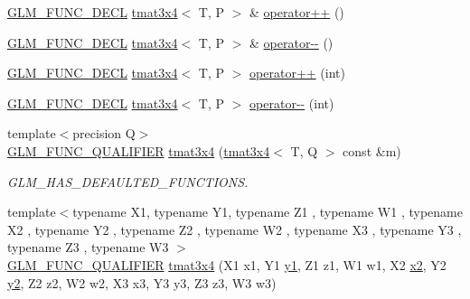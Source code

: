 \begin{DoxyCompactItemize}
\item 
\mbox{\hyperlink{setup_8hpp_ab2d052de21a70539923e9bcbf6e83a51}{G\+L\+M\+\_\+\+F\+U\+N\+C\+\_\+\+D\+E\+CL}} \mbox{\hyperlink{structglm_1_1tmat3x4}{tmat3x4}}$<$ T, P $>$ \& \mbox{\hyperlink{structglm_1_1tmat3x4_ac24005ff599f4b6d3110d252c6b173ea}{operator++}} ()
\item 
\mbox{\hyperlink{setup_8hpp_ab2d052de21a70539923e9bcbf6e83a51}{G\+L\+M\+\_\+\+F\+U\+N\+C\+\_\+\+D\+E\+CL}} \mbox{\hyperlink{structglm_1_1tmat3x4}{tmat3x4}}$<$ T, P $>$ \& \mbox{\hyperlink{structglm_1_1tmat3x4_a5198a23b569931c189191afb025d46e2}{operator-\/-\/}} ()
\item 
\mbox{\hyperlink{setup_8hpp_ab2d052de21a70539923e9bcbf6e83a51}{G\+L\+M\+\_\+\+F\+U\+N\+C\+\_\+\+D\+E\+CL}} \mbox{\hyperlink{structglm_1_1tmat3x4}{tmat3x4}}$<$ T, P $>$ \mbox{\hyperlink{structglm_1_1tmat3x4_a6c7a0194f873068b10b4e1404cba0a89}{operator++}} (int)
\item 
\mbox{\hyperlink{setup_8hpp_ab2d052de21a70539923e9bcbf6e83a51}{G\+L\+M\+\_\+\+F\+U\+N\+C\+\_\+\+D\+E\+CL}} \mbox{\hyperlink{structglm_1_1tmat3x4}{tmat3x4}}$<$ T, P $>$ \mbox{\hyperlink{structglm_1_1tmat3x4_a21eeeba593a5e46ece34f418f43f7a3b}{operator-\/-\/}} (int)
\item 
{\footnotesize template$<$precision Q$>$ }\\\mbox{\hyperlink{setup_8hpp_a33fdea6f91c5f834105f7415e2a64407}{G\+L\+M\+\_\+\+F\+U\+N\+C\+\_\+\+Q\+U\+A\+L\+I\+F\+I\+ER}} \mbox{\hyperlink{structglm_1_1tmat3x4_a2f48d00df66c48b9d37f53aed6bcdec7}{tmat3x4}} (\mbox{\hyperlink{structglm_1_1tmat3x4}{tmat3x4}}$<$ T, Q $>$ const \&m)
\begin{DoxyCompactList}\small\item\em G\+L\+M\+\_\+\+H\+A\+S\+\_\+\+D\+E\+F\+A\+U\+L\+T\+E\+D\+\_\+\+F\+U\+N\+C\+T\+I\+O\+NS. \end{DoxyCompactList}\item 
{\footnotesize template$<$typename X1, typename Y1, typename Z1 , typename W1 , typename X2 , typename Y2 , typename Z2 , typename W2 , typename X3 , typename Y3 , typename Z3 , typename W3 $>$ }\\\mbox{\hyperlink{setup_8hpp_a33fdea6f91c5f834105f7415e2a64407}{G\+L\+M\+\_\+\+F\+U\+N\+C\+\_\+\+Q\+U\+A\+L\+I\+F\+I\+ER}} \mbox{\hyperlink{structglm_1_1tmat3x4_a98439a8c3c24d4185e3e96148d8fbee2}{tmat3x4}} (X1 x1, Y1 \mbox{\hyperlink{glad_8h_a48340161068d267815ac3131e9d03def}{y1}}, Z1 z1, W1 w1, X2 \mbox{\hyperlink{glad_8h_ad2cea6eadb01f017f0d57e7edf0ce988}{x2}}, Y2 \mbox{\hyperlink{glad_8h_af7158b5d27f7a6aa4ab9973fcc3a5c20}{y2}}, Z2 z2, W2 w2, X3 x3, Y3 y3, Z3 z3, W3 w3)

\end{DoxyCompactItemize}
